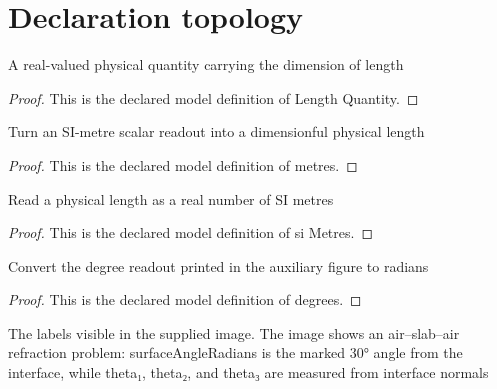 \section{Declaration topology}
\begin{definition}
  \label{def:physics:phyx-mini-0048:phyxminiproblems-problemphyxmini0048-lengthquantity}
  A real-valued physical quantity carrying the dimension of length
\end{definition}
\begin{proof}
  This is the declared model definition of Length Quantity.
\end{proof}
\begin{definition}[metres]
  \label{def:physics:phyx-mini-0048:phyxminiproblems-problemphyxmini0048-metres}
  Turn an SI-metre scalar readout into a dimensionful physical length
\end{definition}
\begin{proof}
  This is the declared model definition of metres.
\end{proof}
\begin{definition}[si Metres]
  \label{def:physics:phyx-mini-0048:phyxminiproblems-problemphyxmini0048-simetres}
  Read a physical length as a real number of SI metres
\end{definition}
\begin{proof}
  This is the declared model definition of si Metres.
\end{proof}
\begin{definition}[degrees]
  \label{def:physics:phyx-mini-0048:phyxminiproblems-problemphyxmini0048-degrees}
  Convert the degree readout printed in the auxiliary figure to radians
\end{definition}
\begin{proof}
  This is the declared model definition of degrees.
\end{proof}
\begin{definition}
  \label{def:physics:phyx-mini-0048:phyxminiproblems-problemphyxmini0048-auxiliaryrefractionfigure}
  The labels visible in the supplied image. The image shows an air--slab--air refraction problem: surfaceAngleRadians is the marked 30° angle from the interface, while theta₁, theta₂, and theta₃ are measured from interface normals
\end{definition}
